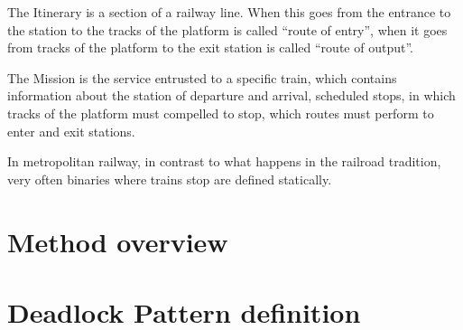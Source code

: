 \documentclass{ewic}
\begin{document}
			The Itinerary is a section of a railway line. When this goes from the entrance to the station to the tracks of the platform is called ``route of entry'', when it goes from tracks of the platform to the exit station is called ``route of output''.
			
			
			The Mission is the service entrusted to a specific train, which contains information about the station of departure and arrival, scheduled stops, in which tracks of the platform must compelled to stop, which routes must perform to enter and exit stations.
			 
			
			
			In metropolitan railway, in contrast to what happens in the railroad tradition, very often binaries where trains stop are defined statically.
			 
			
			
			
			 
			
			\section{Method overview}\label{sec:method}
			
			
		\section{Deadlock Pattern definition}\label{sec:deadlockpatterndefinition}
			
\end{document}
